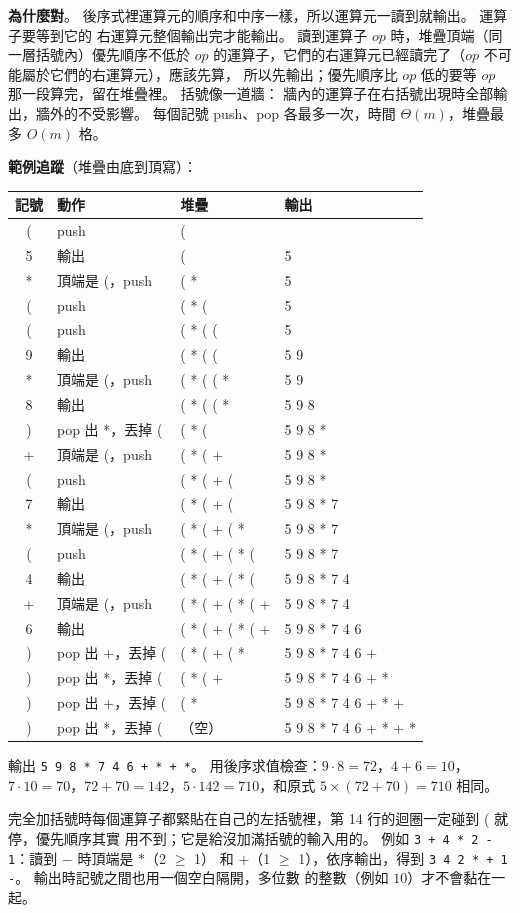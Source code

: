 \begin{pastsoln}
\textbf{為什麼對}。 後序式裡運算元的順序和中序一樣，所以運算元一讀到就輸出。 運算子要等到它的
右運算元整個輸出完才能輸出。 讀到運算子 $\mathit{op}$ 時，堆疊頂端（同一層括號內）優先順序不低於
$\mathit{op}$ 的運算子，它們的右運算元已經讀完了（$\mathit{op}$ 不可能屬於它們的右運算元），應該先算，
所以先輸出；優先順序比 $\mathit{op}$ 低的要等 $\mathit{op}$ 那一段算完，留在堆疊裡。 括號像一道牆：
牆內的運算子在右括號出現時全部輸出，牆外的不受影響。 每個記號 push、pop 各最多一次，時間
$\Theta(m)$，堆疊最多 $O(m)$ 格。

\textbf{範例追蹤}（堆疊由底到頂寫）：
\begin{center}
\small
\begin{tabular}{clll}
\toprule
記號 & 動作 & 堆疊 & 輸出 \\
\midrule
( & push & ( & \\
5 & 輸出 & ( & 5 \\
* & 頂端是 (，push & ( * & 5 \\
( & push & ( * ( & 5 \\
( & push & ( * ( ( & 5 \\
9 & 輸出 & ( * ( ( & 5 9 \\
* & 頂端是 (，push & ( * ( ( * & 5 9 \\
8 & 輸出 & ( * ( ( * & 5 9 8 \\
) & pop 出 *，丟掉 ( & ( * ( & 5 9 8 * \\
+ & 頂端是 (，push & ( * ( + & 5 9 8 * \\
( & push & ( * ( + ( & 5 9 8 * \\
7 & 輸出 & ( * ( + ( & 5 9 8 * 7 \\
* & 頂端是 (，push & ( * ( + ( * & 5 9 8 * 7 \\
( & push & ( * ( + ( * ( & 5 9 8 * 7 \\
4 & 輸出 & ( * ( + ( * ( & 5 9 8 * 7 4 \\
+ & 頂端是 (，push & ( * ( + ( * ( + & 5 9 8 * 7 4 \\
6 & 輸出 & ( * ( + ( * ( + & 5 9 8 * 7 4 6 \\
) & pop 出 +，丟掉 ( & ( * ( + ( * & 5 9 8 * 7 4 6 + \\
) & pop 出 *，丟掉 ( & ( * ( + & 5 9 8 * 7 4 6 + * \\
) & pop 出 +，丟掉 ( & ( * & 5 9 8 * 7 4 6 + * + \\
) & pop 出 *，丟掉 ( & （空） & 5 9 8 * 7 4 6 + * + * \\
\bottomrule
\end{tabular}
\end{center}
輸出 \texttt{5 9 8 * 7 4 6 + * + *}。 用後序求值檢查：$9 \cdot 8 = 72$，$4 + 6 = 10$，
$7 \cdot 10 = 70$，$72 + 70 = 142$，$5 \cdot 142 = 710$，和原式 $5 \times (72 + 70) = 710$ 相同。

完全加括號時每個運算子都緊貼在自己的左括號裡，第 14 行的迴圈一定碰到 ( 就停，優先順序其實
用不到；它是給沒加滿括號的輸入用的。 例如 \texttt{3 + 4 * 2 - 1}：讀到 $-$ 時頂端是 $*$（2 $\ge$ 1）
和 $+$（1 $\ge$ 1），依序輸出，得到 \texttt{3 4 2 * + 1 -}。 輸出時記號之間也用一個空白隔開，多位數
的整數（例如 $10$）才不會黏在一起。
\end{pastsoln}
